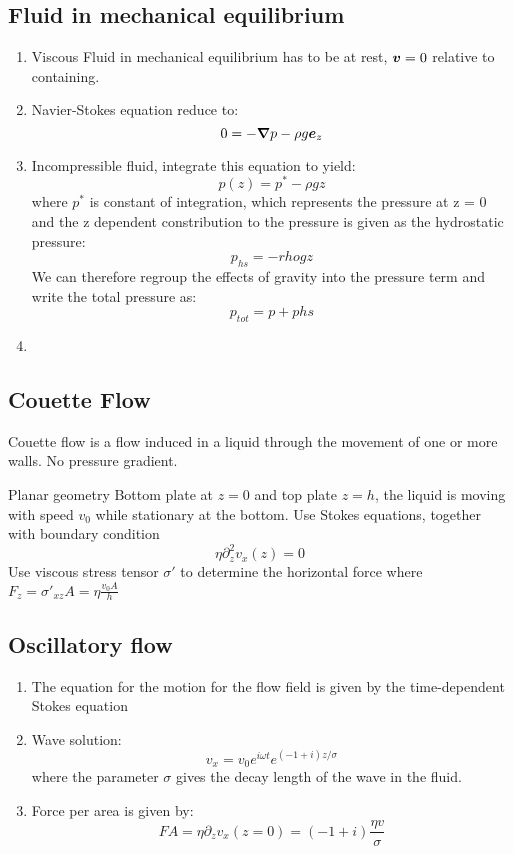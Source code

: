 \documentclass[12pt,a4paper]{article}
\begin{document}
        \subsection{Fluid in mechanical equilibrium}
            \begin{enumerate}
                \item Viscous Fluid in mechanical equilibrium has to be at rest, $\vb*{v}=0$ relative to containing.
                \item Navier-Stokes equation reduce to:
                $$
                    0 = -\grad{p} -\rho g \vb*{e}_z
                $$
                \item Incompressible fluid, integrate this equation to yield:
                $$
                    p(z) = p^{*} - \rho g z
                $$
                where $p^{*}$ is constant of integration, which represents the pressure at z = 0 and the z dependent constribution to the pressure is given as the hydrostatic pressure:
                $$
                    p_{hs} = - rho gz
                $$
                We can therefore regroup the effects of gravity into the pressure term and write the total pressure as:
                $$
                    p_{tot} = p + p{hs}
                $$
                \item 
            \end{enumerate}
        \subsection{Couette Flow}
            Couette flow is a flow induced in a liquid through the movement of one or more walls. No pressure gradient.  
            \begin{example}
                {Planar geometry}{
                    Bottom plate at $z=0$ and top plate $z=h$, the liquid is moving with speed $v_0$ while stationary at the bottom.
                    Use Stokes equations, together with boundary condition
                    $$
                        \eta \partial^2_z v_x(z) = 0
                    $$
                    Use viscous stress tensor $\sigma '$ to determine the horizontal force where $F_z=\sigma '_{xz}A = \eta \frac{v_0 A}{h}$
                }
            \end{example}
        \subsection{Oscillatory flow}
            \begin{enumerate}
                \item The equation for the motion for the flow field is given by the time-dependent Stokes equation
                
                \item Wave solution:
                $$
                    v_x = v_0 e^{i\omega t}e^{(-1+i)z/\sigma}
                $$
                where the parameter $\sigma$ gives the decay length of the wave in the fluid.
                \item Force per area is given by:
                $$
                    FA = \eta \partial_z v_x (z=0) = (-1+i) \frac {\eta v}{\sigma}
                $$
            \end{enumerate}
\end{document}
